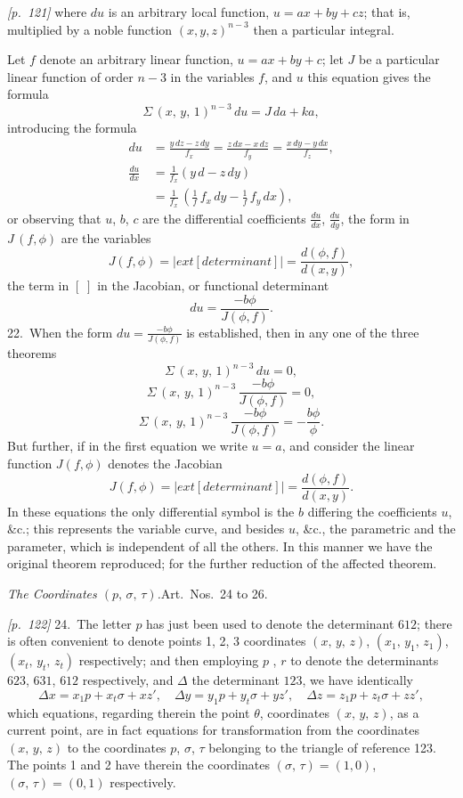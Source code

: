 \documentclass[11pt,a4paper]{book}
\begin{document}
\bigskip\noindent\textit{[p.~121]} where $du$ is an arbitrary local function, $u = ax + by + cz$; that is, multiplied by a noble function $(x, y, z)^{n-3}$ then a particular integral.

Let $f$ denote an arbitrary linear function, $u = ax + by + c$; let $J$ be a particular linear function of order $n - 3$ in the variables $f$, and $u$ this equation gives the formula
\[
\Sigma\,(x,\,y,\,1)^{n-3}\,du = J\,da + ka,
\]
introducing the formula
\begin{align*}
du &= \frac{y\,dz - z\,dy}{f_x} = \frac{z\,dx - x\,dz}{f_y} = \frac{x\,dy - y\,dx}{f_z},\\
\frac{du}{dx} &= \frac{1}{f_x}(y\,d - z\,dy)\\
&= \frac{1}{f_x}\,\left(\frac{1}{f}\,f_x\,dy - \frac{1}{f}\,f_y\,dx\right),
\end{align*}
or observing that $u$, $b$, $c$ are the differential coefficients $\frac{du}{dx}$, $\frac{du}{dy}$, the form in $J\,(f, \phi)$ are the variables
\[
J(f, \phi) =
\left|
	ext{[determinant]}
\right| = \frac{d(\phi, f)}{d(x, y)},
\]
the term in $[\;]$ in the Jacobian, or functional determinant
\[
du = \frac{-b\phi}{J(\phi, f)}.
\]
22.\ When the form $du = \frac{-b\phi}{J(\phi, f)}$ is established, then in any one of the three theorems
\[
\Sigma\,(x,\,y,\,1)^{n-3}\,du = 0,
\]
\[
\Sigma\,(x,\,y,\,1)^{n-3}\,\frac{-b\phi}{J(\phi, f)} = 0,
\]
\[
\Sigma\,(x,\,y,\,1)^{n-3}\,\frac{-b\phi}{J(\phi, f)} = -\frac{b\phi}{\phi}.
\]
But further, if in the first equation we write $u = a$, and consider the linear function $J(f, \phi)$ denotes the Jacobian
\[
J(f, \phi) =
\left|
	ext{[determinant]}
\right| = \frac{d(\phi, f)}{d(x, y)}.
\]
In these equations the only differential symbol is the $b$ differing the coefficients $u$, \&c.; this represents the variable curve, and besides $u$, \&c., the parametric and the parameter, which is independent of all the others. In this manner we have the original theorem reproduced; for the further reduction of the affected theorem.

\bigskip

\textit{The Coordinates $(p,\,\sigma,\,\tau)$.}\quad Art.\ Nos.~24 to 26.

\noindent\textit{[p.~122]} 24.\ The letter $p$ has just been used to denote the determinant $612$; there is often convenient to denote points 1, 2, 3 coordinates $(x,\,y,\,z)$, $(x_1,\,y_1,\,z_1)$, $(x_t,\,y_t,\,z_t)$ respectively; and then employing $p$ , $r$ to denote the determinants $623$, $631$, $612$ respectively, and $\Delta$ the determinant $123$, we have identically
\[
\Delta x = x_1 p + x_t \sigma + x z',\quad \Delta y = y_1 p + y_t \sigma + y z',\quad \Delta z = z_1 p + z_t \sigma + z z',
\]
which equations, regarding therein the point $\theta$, coordinates $(x,\,y,\,z)$, as a current point, are in fact equations for transformation from the coordinates $(x,\,y,\,z)$ to the coordinates $p$, $\sigma$, $\tau$ belonging to the triangle of reference 123. The points 1 and 2 have therein the coordinates $(\sigma,\,\tau) = (1, 0)$, $(\sigma,\,\tau) = (0, 1)$ respectively.
\end{document}
